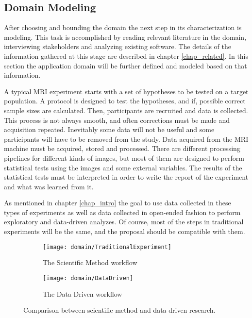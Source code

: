 
%


\subsection{Domain Modeling}

After choosing and bounding the domain the next step in its characterization is modeling. This task is accomplished by reading relevant literature in the domain, interviewing stakeholders and analyzing existing software. The details of the information gathered at this stage are described in chapter \ref{chap_related}. In this section the application domain will be further defined and modeled based on that information.

A typical MRI experiment starts with a set of hypotheses to be tested on a target population. A protocol is designed to test the hypotheses, and if, possible correct sample sizes are calculated. Then, participants are recruited and data is collected. This process is not always smooth, and often corrections must be made and acquisition repeated. Inevitably some data will not be useful and some participants will have to be removed from the study. Data acquired from the MRI machine must be acquired, stored and processed. There are different processing pipelines for different kinds of images, but most of them are designed to perform statistical tests using the images and some external variables. The results of the statistical tests must be interpreted in order to write the report of the experiment and what was learned from it.

As mentioned in chapter \ref{chap_intro} the goal to use data collected in these types of experiments as well as data collected in open-ended fashion to perform exploratory and data-driven analyzes. Of course, most of the steps in traditional experiments will be the same, and the proposal should be compatible with them. 

\begin{figure}
\centering
\begin{subfigure}[b]{\textwidth}
\texttt{[image: domain/TraditionalExperiment]}
\caption{The Scientific Method workflow}	
\end{subfigure}

\begin{subfigure}[b]{\textwidth}
\texttt{[image: domain/DataDriven]}	
\caption{The Data Driven workflow}	
\end{subfigure}

\caption{\label{fig_workflows}Comparison between scientific method and data driven research.}
\end{figure}

